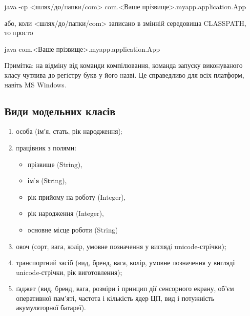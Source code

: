 java -cp <шлях/до/папки/com> com.<Ваше прізвище>.myapp.application.App

або, коли <шлях/до/папки/com> записано в змінній середовища CLASSPATH, то просто

java com.<Ваше прізвище>.myapp.application.App

Примітка: на відміну від команди компілювання, команда запуску виконуваного класу чутлива до регістру букв у його назві. Це справедливо для всіх платформ, навіть MS Windows.

\subsection{Види модельних класів}
\begin{enumerate}
\item особа (ім’я, стать, рік народження);
\item працівник з полями:
	\begin{itemize}
	\item прізвище (String),
	\item ім’я (String),
	\item рік прийому на роботу (Integer),
	\item рік народження (Integer),
	\item основне місце роботи (String)
	\end{itemize}
\item овоч (сорт, вага, колір, умовне позначення у вигляді unicode-стрічки);
\item транспортний засіб (вид, бренд, вага, колір, умовне позначення у вигляді unicode-стрічки, рік виготовлення);
\item ґаджет (вид, бренд, вага, розміри і принцип дії сенсорного екрану, об’єм оперативної пам’яті, частота і кількість ядер ЦП, вид і потужність акумуляторної батареї).
\end{enumerate}

